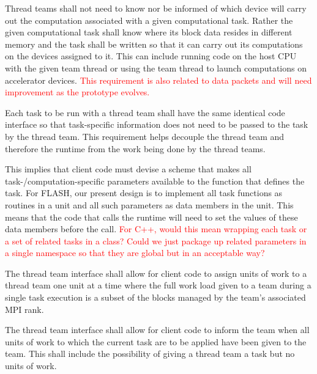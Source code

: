 \documentclass{article}
\begin{document}
\begin{req}
Thread teams shall not need to know nor be informed of which device will carry
out the computation associated with a given computational task.  Rather the
given computational task shall know where its block data resides in different
memory and the task shall be written so that it can carry out its computations
on the devices assigned to it.  This can include running code on the host CPU
with the given team thread or using the team thread to launch computations on
accelerator devices.  \textcolor{red}{This requirement is also related to data
packets and will need improvement as the prototype evolves.}
\end{req}

\begin{req}
Each task to be run with a thread team shall have the same identical code
interface so that task-specific information does not need to be passed to the
task by the thread team.  This requirement helps decouple the thread team and
therefore the runtime from the work being done by the thread teams.
\end{req}

This implies that client code must devise a scheme that makes all
task-/computation-specific parameters available to the function that defines the
task.  For FLASH, our present design is to implement all task functions as
routines in a unit and all such parameters as data members in the unit.  This
means that the code that calls the runtime will need to set the values of these
data members before the call.  \textcolor{red}{For C++, would this mean wrapping
each task or a set of related tasks in a class?  Could we just package up
related parameters in a single namespace so that they are global but in an
acceptable way?}


\begin{req}
The thread team interface shall allow for client code to assign units of
work to a thread team one unit at a time where the full work load given to a
team during a single task execution is a subset of the blocks managed by the
team's associated MPI rank.
\end{req}

\begin{req}
The thread team interface shall allow for client code to inform the team when
all units of work to which the current task are to be applied have been given to
the team.  This shall include the possibility of giving a thread team a task but
no units of work.
\end{req}
\end{document}
